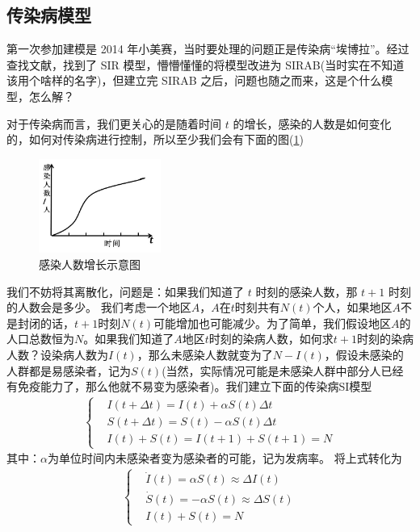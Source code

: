 	\subsection{传染病模型}
		\label{sub:sub:de-ode-modeling-sir}
		第一次参加建模是 2014 年小美赛，当时要处理的问题正是传染病“埃博拉”。经过查找文献，找到了 SIR 模型，懵懵懂懂的将模型改进为 SIRAB(当时实在不知道该用个啥样的名字)，但建立完 SIRAB 之后，问题也随之而来，这是个什么模型，怎么解？
		\par
		对于传染病而言，我们更关心的是随着时间 $t$ 的增长，感染的人数是如何变化的，如何对传染病进行控制，所以至少我们会有下面的图(\ref{fig:感染人数增长示意图})
		\begin{figure}[H]
		\centering
		\includegraphics[width=4cm]{images/Infection_increased_schematic_diagram.jpg}%
		\caption{感染人数增长示意图}
		\label{fig:感染人数增长示意图}
		\end{figure}
		\par
		我们不妨将其离散化，问题是：如果我们知道了 $t$ 时刻的感染人数，那 $t + 1$ 时刻的人数会是多少。
		我们考虑一个地区$A$，$A$在$t$时刻共有$N(t)$个人，如果地区$A$不是封闭的话，$t+1$时刻$N(t)$可能增加也可能减少。为了简单，我们假设地区$A$的人口总数恒为$N$。如果我们知道了$A$地区$t$时刻的染病人数，如何求$t+1$时刻的染病人数？设染病人数为$I(t)$，那么未感染人数就变为了$N-I(t)$，假设未感染的人群都是易感染者，记为$S(t)$(当然，实际情况可能是未感染人群中部分人已经有免疫能力了，那么他就不易变为感染者)。我们建立下面的传染病SI模型
		\begin{align*}
			 \left\{
				 \begin{aligned}
					 &I(t+\Delta t) = I(t) + \alpha S(t) \Delta t\\
					 &S(t+\Delta t) = S(t) - \alpha S(t) \Delta t\\
					 &I(t) + S(t) = I(t+1)+S(t+1) = N
				 \end{aligned}
			 \right.
		\end{align*}
		其中：$\alpha$为单位时间内未感染者变为感染者的可能，记为发病率。
		将上式转化为
		\begin{align*}
			 \left\{
				 \begin{aligned}
					 &\dot{I}(t) = \alpha S(t) \approx \Delta I(t)\\
					 &\dot{S}(t) = - \alpha S(t) \approx \Delta S(t)\\
					 &I(t) + S(t) = N
				 \end{aligned}
			 \right.
		\end{align*}
